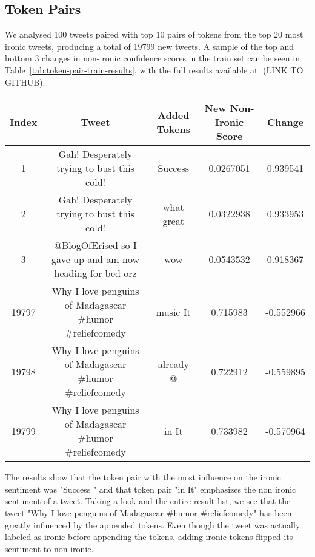 \documentclass[10pt, a4paper]{article}
\begin{document}
\subsection{Token Pairs}

We analysed 100 tweets paired with top 10 pairs of tokens from the top 20 most ironic tweets, producing a total of 19799 new tweets. A sample of the top and bottom 3 changes in non-ironic confidence scores in the train set can be seen in Table~\ref{tab:token-pair-train-results}, with the full results available at: (LINK TO GITHUB).

\begin{table*}
\caption{Sample of Token Pair Results on the Train Set}
\label{tab:token-pair-train-results}
\begin{center}
\begin{tabular}{c|c|c|c|c}
\toprule
Index & Tweet & Added Tokens & New Non-Ironic Score & Change\\
\midrule
1     & Gah! Desperately trying to bust this cold!                & Success \textvisiblespace & 0.0267051 & 0.939541  \\
2     & Gah! Desperately trying to bust this cold!                & what great                & 0.0322938 & 0.933953  \\
3     & @BlogOfErised so I gave up and am now heading for bed orz & wow \textvisiblespace     & 0.0543532 & 0.918367  \\
19797 & Why I love penguins of Madagascar \#humor \#reliefcomedy  & music It                  & 0.715983  & -0.552966 \\
19798 & Why I love penguins of Madagascar \#humor \#reliefcomedy  & already @                 & 0.722912  & -0.559895 \\
19799 & Why I love penguins of Madagascar \#humor \#reliefcomedy  & in It                     & 0.733982  & -0.570964 \\
\bottomrule
\end{tabular}
\end{center}
\end{table*}

The results show that the token pair with the most influence on the ironic sentiment was "Success \textvisiblespace " and that token pair "in It" emphasizes the non ironic sentiment of a tweet.
Taking a look and the entire result list, we see that the tweet "Why I love penguins of Madagascar  #humor #reliefcomedy" has been greatly influenced by the appended tokens.
Even though the tweet was actually labeled as ironic before appending the tokens, adding ironic tokens flipped its sentiment to non ironic.
\end{document}
